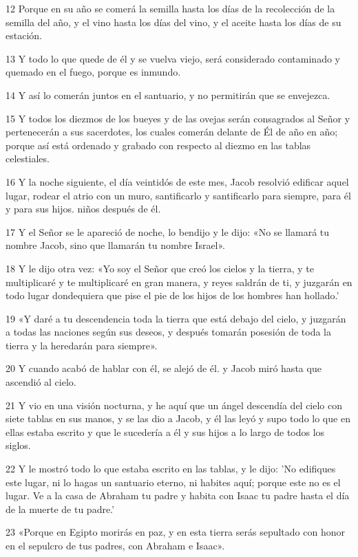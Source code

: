 \par 12 Porque en su año se comerá la semilla hasta los días de la recolección de la semilla del año, y el vino hasta los días del vino, y el aceite hasta los días de su estación.
\par 13 Y todo lo que quede de él y se vuelva viejo, será considerado contaminado y quemado en el fuego, porque es inmundo.
\par 14 Y así lo comerán juntos en el santuario, y no permitirán que se envejezca.
\par 15 Y todos los diezmos de los bueyes y de las ovejas serán consagrados al Señor y pertenecerán a sus sacerdotes, los cuales comerán delante de Él de año en año; porque así está ordenado y grabado con respecto al diezmo en las tablas celestiales.
\par 16 Y la noche siguiente, el día veintidós de este mes, Jacob resolvió edificar aquel lugar, rodear el atrio con un muro, santificarlo y santificarlo para siempre, para él y para sus hijos. niños después de él.
\par 17 Y el Señor se le apareció de noche, lo bendijo y le dijo: «No se llamará tu nombre Jacob, sino que llamarán tu nombre Israel».
\par 18 Y le dijo otra vez: «Yo soy el Señor que creó los cielos y la tierra, y te multiplicaré y te multiplicaré en gran manera, y reyes saldrán de ti, y juzgarán en todo lugar dondequiera que pise el pie de los hijos de los hombres han hollado.'
\par 19 «Y daré a tu descendencia toda la tierra que está debajo del cielo, y juzgarán a todas las naciones según sus deseos, y después tomarán posesión de toda la tierra y la heredarán para siempre».
\par 20 Y cuando acabó de hablar con él, se alejó de él. y Jacob miró hasta que ascendió al cielo.
\par 21 Y vio en una visión nocturna, y he aquí que un ángel descendía del cielo con siete tablas en sus manos, y se las dio a Jacob, y él las leyó y supo todo lo que en ellas estaba escrito y que le sucedería a él y sus hijos a lo largo de todos los siglos.
\par 22 Y le mostró todo lo que estaba escrito en las tablas, y le dijo: 'No edifiques este lugar, ni lo hagas un santuario eterno, ni habites aquí; porque este no es el lugar. Ve a la casa de Abraham tu padre y habita con Isaac tu padre hasta el día de la muerte de tu padre.'
\par 23 «Porque en Egipto morirás en paz, y en esta tierra serás sepultado con honor en el sepulcro de tus padres, con Abraham e Isaac».
